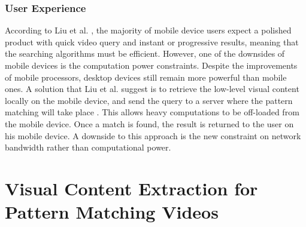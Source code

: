 \subsubsection{User Experience}

According to Liu et al. \cite{liu2014mobilevideosearch}, the majority of mobile device users expect a polished product with quick video query and instant or progressive results, meaning that the searching algorithms must be efficient. However, one of the downsides of mobile devices is the computation power constraints. Despite the improvements of mobile processors, desktop devices still remain more powerful than mobile ones. A solution that Liu et al. suggest is to retrieve the low-level visual content locally on the mobile device, and send the query to a server where the pattern matching will take place \cite{liu2014mobilevideosearch}. This allows heavy computations to be off-loaded from the mobile device. Once a match is found, the result is returned to the user on his mobile device. A downside to this approach is the new constraint on network bandwidth rather than computational power.

\section{Visual Content Extraction for Pattern Matching Videos}

